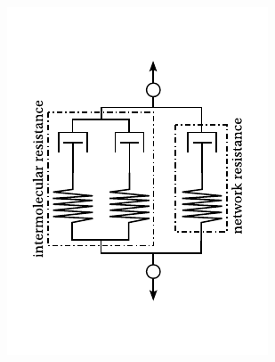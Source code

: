 \begin{figure}[hbtp]
\centering
\begin{subfigure}[b]{0.45\textwidth}
\centering
\includegraphics[width=\textwidth]{figures/ahzi_parallel}
\caption{}
\label{subfig:ahzi_parallel}
\end{subfigure} \hfill
	\begin{subfigure}[b]{0.45\textwidth}
		\centering

\end{subfigure}
\end{figure}
